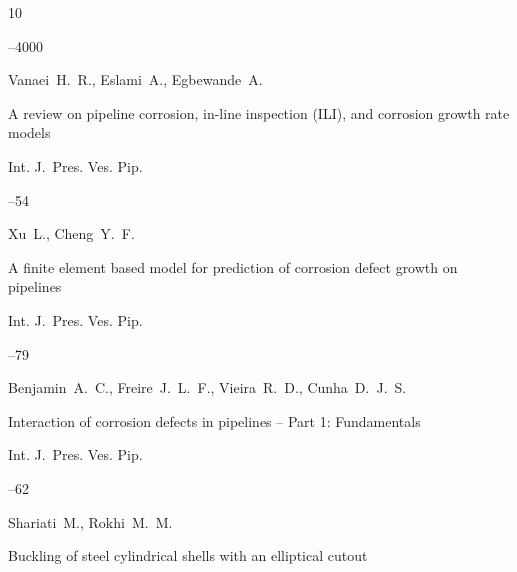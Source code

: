 \begin{thebibliography}{10}



--4000






\by Vanaei~H.~R., Eslami~A., Egbewande~A.

\paper A review on pipeline corrosion, in-line inspection (ILI), and corrosion growth rate models

\jour Int. J.~Pres. Ves. Pip.



--54






\by Xu~L., Cheng~Y.~F.

\paper A finite element based model for prediction of corrosion defect growth on pipelines

\jour Int. J.~Pres. Ves. Pip.



--79






\by Benjamin~A.~C., Freire~J.~L.~F., Vieira~R.~D., Cunha~D.~J.~S.

\paper Interaction of corrosion defects in pipelines – Part 1: Fundamentals

\jour Int. J.~Pres. Ves. Pip.



--62






\by Shariati~M., Rokhi~M.~M.

\paper Buckling of steel cylindrical shells with an elliptical cutout


\end{thebibliography}
